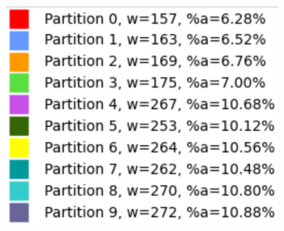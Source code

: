 \begin{figure}[h]
\centering
\begin{subfigure}{.33\textwidth}
    \centering
    \caption[short]{}
\end{subfigure}%
\begin{subfigure}{.33\textwidth}
    \centering
    \caption[short]{}
\end{subfigure}%
\begin{subfigure}{.33\textwidth}
    \centering
    \includegraphics[width=0.9\linewidth]{images/results/m_k/with/13/results}

\end{subfigure}
\end{figure}
